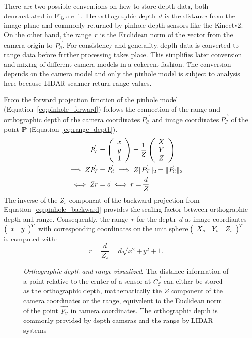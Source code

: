 There are two possible conventions on how to store depth data, both demonstrated in Figure~\ref{fig:range_depth}.
The orthographic depth~$d$ is the distance from the image plane and commonly returned by pinhole depth sensors like the Kinectv2\cite{wasenmuller_accv2016}.
On the other hand, the range~$r$ is the Euclidean norm of the vector from the camera origin to $\vec{P_\mathcal{C}}$.
For consistency and generality, depth data is converted to range data before further processing takes place.
This simplifies later conversion and mixing of different camera models in a coherent fashion.
The conversion depends on the camera model and only the pinhole model is subject to analysis here because \acrshort{LIDAR} scanner return range values.

\pagebreak
From the forward projection function of the pinhole model (Equation~\ref{eq:pinhole_forward}) follows the connection of the range and orthographic depth of the camera coordinates $\vec{P_\mathcal{C}}$ and image coordinates $\vec{P_\mathcal{I}}$ of the point $\mathbf{P}$ (Equation~\ref{eq:range_depth}).
\begin{equation}
\begin{aligned}
    \vec{P_\mathcal{I}} &= \left(\begin{array}{c} x \\ y \\ 1 \end{array}\right) = \frac{1}{Z}\left(\begin{array}{c} X \\ Y \\ Z \end{array}\right) \\
    \implies Z \vec{P_\mathcal{I}} &= \vec{P_\mathcal{C}} \implies Z \lVert\vec{P_\mathcal{I}}\rVert_{2} = \lVert\vec{P_\mathcal{C}}\rVert_{2} \\
    \iff Z r &= d \iff r = \frac{d}{Z}
    \label{eq:range_depth}
\end{aligned}
\end{equation}
The inverse of the $Z_{s}$ component of the backward projection from Equation~\ref{eq:pinhole_backward} provides the scaling factor between orthographic depth and range.
Consequently, the range~$r$ for the depth~$d$ at image coordiantes $\left(\begin{array}{cc} x & y \end{array}\right)^T$ with corresponding coordinates on the unit sphere $\left(\begin{array}{ccc} X_s & Y_s & Z_s \end{array}\right)^T$ is computed with:
\begin{equation}
    r = \frac{d}{Z_s} = d \sqrt{x^2 + y^2 + 1}\text{.}
\end{equation}
\begin{figure}[hb]
    \scalebox{0.8}{%
    
    }
    \caption[Orthographic depth and range visualized]{\emph{Orthographic depth and range visualized.} The distance information of a point relative to the center of a sensor at $\vec{C_\mathcal{C}}$ can either be stored as the orthographic depth, mathematically the $Z$ component of the camera coordinates or the range, equivalent to the Euclidean norm of the point $\vec{P_\mathcal{C}}$ in camera coordinates. The orthographic depth is commonly provided by depth cameras and the range by \acrshort{LIDAR} systems.}
    \label{fig:range_depth}
\end{figure}
